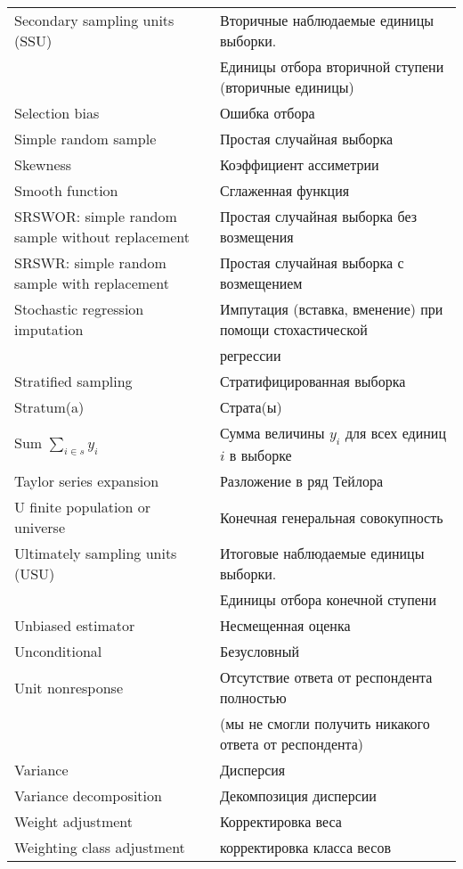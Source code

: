 \documentclass[12pt]{article}
\begin{document}
\begin{center}
\begin{tabular}{l|l}
\hline
Secondary sampling units (SSU)& Вторичные наблюдаемые единицы выборки. \\ & Единицы отбора вторичной ступени (вторичные единицы)\\
Selection bias & Ошибка отбора\\
Simple random sample & Простая случайная выборка \\
Skewness & Коэффициент ассиметрии\\
Smooth function & Сглаженная функция\\
SRSWOR: simple random sample without replacement & Простая случайная выборка без возмещения \\
SRSWR: simple random sample with replacement & Простая случайная выборка с возмещением \\
Stochastic regression imputation & Импутация (вставка, вменение) при помощи стохастической \\& регрессии\\
Stratified sampling& Стратифицированная выборка\\
Stratum(a) & Страта(ы)\\
Sum $\sum_{i \in s}y_i$ & Сумма величины $y_i$ для всех единиц $i$ в выборке\\
Taylor series expansion & Разложение в ряд Тейлора\\
U finite population or universe& Конечная генеральная совокупность\\
Ultimately sampling units (USU)& Итоговые наблюдаемые единицы выборки. \\& Единицы отбора конечной ступени\\
Unbiased estimator & Несмещенная оценка \\
Unconditional & Безусловный \\
Unit nonresponse & Отсутствие ответа от респондента полностью \\&(мы не смогли получить никакого ответа от респондента)\\
Variance & Дисперсия \\
Variance decomposition & Декомпозиция дисперсии\\
Weight adjustment & Корректировка веса\\
Weighting class adjustment & корректировка класса весов \\


\hline
\end{tabular}
\end{center}
\end{document}
